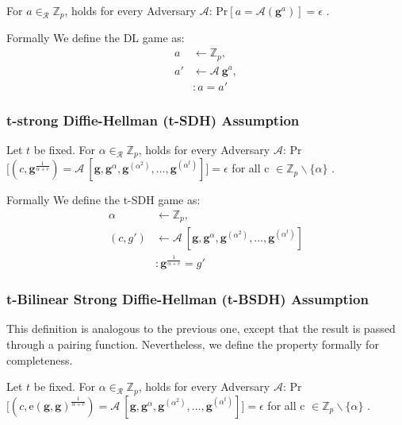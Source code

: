 \begin{definition}
    For $a \in_\mathcal{R} \mathbb{Z}_p$, holds for every Adversary $\mathcal{A}$: Pr$[a=\mathcal{A}(\textbf{g}^a)] = \epsilon$ \parencite{KZG}.

    Formally We define the DL game as:
    \begin{equation*}
        \begin{split}
            a & \leftarrow \mathbb{Z}_p,\\
            a' & \leftarrow \mathcal{A}\ \textbf{g}^a,\\
            & : a = a'
        \end{split}
    \end{equation*}
\end{definition}


\subsubsection{t-strong Diffie-Hellman (t-SDH) Assumption}
Let $t$ be fixed. For $\alpha \in_\mathcal{R} \mathbb{Z}_p$, holds for every Adversary $\mathcal{A}$: Pr$\Big[
    (c,\textbf{g}^{\frac{1}{\alpha+c}})=\mathcal{A}\ [\textbf{g}, \textbf{g}^\alpha, \textbf{g}^{(\alpha^2)}, \dots, \textbf{g}^{(\alpha^t)}]
    \Big] 
= \epsilon$ for all c $\in \mathbb{Z}_p\backslash\{\alpha\}$ \parencite{KZG}.

Formally We define the t-SDH game as:
\begin{equation*}
    \begin{split}
        \alpha & \leftarrow \mathbb{Z}_p,\\
        (c, g') & \leftarrow  \mathcal{A}\ [\textbf{g}, \textbf{g}^\alpha, \textbf{g}^{(\alpha^2)}, \dots, \textbf{g}^{(\alpha^t)}]\\
        & : \textbf{g}^{\frac{1}{\alpha+c}} = g'
    \end{split}
\end{equation*}

\subsubsection{t-Bilinear Strong Diffie-Hellman (t-BSDH) Assumption}
This definition is analogous to the previous one, except that the result is passed through a pairing function. Nevertheless, we define the property formally for completeness. 

Let $t$ be fixed. For $\alpha \in_\mathcal{R} \mathbb{Z}_p$, holds for every Adversary $\mathcal{A}$: Pr$\Big[
    (c,\text{e}(\textbf{g}, \textbf{g})^{\frac{1}{\alpha+c}})=\mathcal{A}\ [\textbf{g}, \textbf{g}^\alpha, \textbf{g}^{(\alpha^2)}, \dots, \textbf{g}^{(\alpha^t)}]
    \Big] 
= \epsilon$ for all c $\in \mathbb{Z}_p\backslash\{\alpha\}$ \parencite{KZG}.

